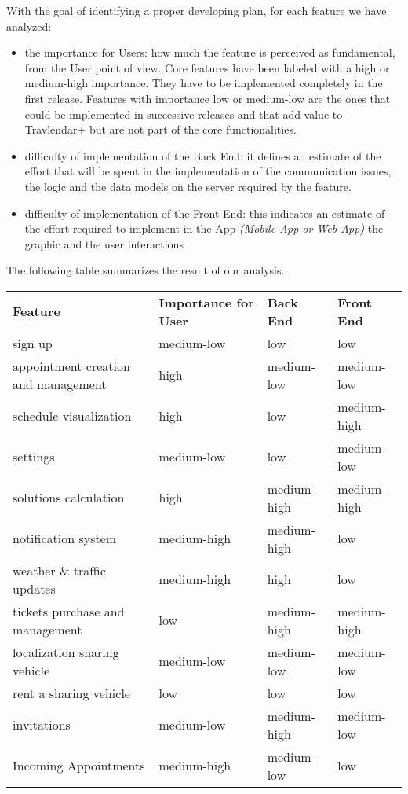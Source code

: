 With the goal of identifying a proper developing plan, for each feature we have analyzed:
\begin{itemize}
	\item the importance for Users: how much the feature is perceived as fundamental, from the User point of view. Core features have been labeled with a high or medium-high importance. They have to be implemented completely in the first release. Features with importance low or medium-low are the ones that could be implemented in successive releases and that add value to Travlendar+ but are not part of the core functionalities.
	\item difficulty of implementation of the Back End: it defines an estimate of the effort that will be spent in the implementation of the communication issues, the logic and the data models on the server required by the feature.
	\item difficulty of implementation of the Front End: this indicates an estimate of the effort required to implement in the App \textit{(Mobile App or Web App)} the graphic and the user interactions
\end{itemize}

\noindent
The following table summarizes the result of our analysis.

\begin{center}
	\renewcommand{\arraystretch}{1.5}
	\begin{tabular}{|p{} l l l|}
		\hline
		\rowcolor{gray!45}
		\textbf{Feature} & \textbf{Importance for User} & \textbf{Back End} & \textbf{Front End}\\

		sign up 					& medium-low 	& low 			& low \\
		appointment creation and management	& high 	& medium-low	& medium-low \\
		schedule visualization		& high 			& low			& medium-high \\
		settings 					& medium-low 	& low			& medium-low \\
		solutions calculation 		& high 			& medium-high	& medium-high \\
		notification system 		& medium-high 	& medium-high	& low \\
		weather \& traffic updates 	& medium-high 	& high			& low \\
		tickets purchase and management	& low 		& medium-high	& medium-high \\
		localization sharing vehicle& medium-low 	& medium-low	& medium-low \\
		rent a sharing vehicle		& low 			& low			& low \\
		invitations					& medium-low	& medium-high	& medium-low \\
		Incoming Appointments		& medium-high	& medium-low	& low \\
		\hline
	\end{tabular}
\end{center}

